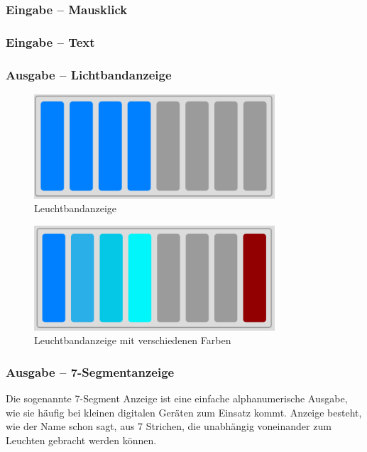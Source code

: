 \subsubsection{Eingabe -- Mausklick}

\subsubsection{Eingabe -- Text}

\subsubsection{Ausgabe -- Lichtbandanzeige}
\begin{figure}[ht]
	\centering
  \includegraphics[width=0.8\textwidth]{Images/Lightstrip}
	\caption{Leuchtbandanzeige}
	\label{Lightstrip}
\end{figure}

\begin{figure}[ht]
	\centering
  \includegraphics[width=0.8\textwidth]{Images/Lightstrip_colors}
	\caption{Leuchtbandanzeige mit verschiedenen Farben}
	\label{Lightstrip_Colors}
\end{figure}


\subsubsection{Ausgabe -- 7-Segmentanzeige}
Die sogenannte 7-Segment Anzeige ist eine einfache alphanumerische Ausgabe, 
wie sie häufig bei kleinen digitalen Geräten zum Einsatz kommt.
Anzeige besteht, wie der Name schon sagt, aus 7 Strichen, die unabhängig voneinander zum Leuchten gebracht werden können.

